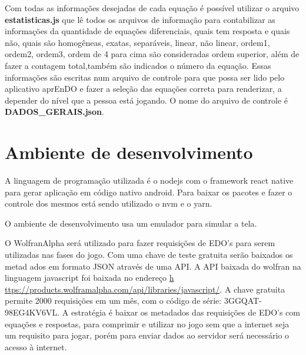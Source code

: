 Com todas as informações desejadas de cada equação é possível utilizar o arquivo \textbf{estatisticas.js} que lê todos os arquivos de informação para contabilizar as informações da quantidade de equações diferenciais, quais tem resposta e quais não, quais são homogêneas, exatas, separáveis, linear, não linear, ordem1, ordem2, ordem3, ordem de 4 para cima são consideradas ordem superior, além de fazer a contagem total,também são indicados o número da equação. Essas informações são escritas num arquivo de controle para que possa ser lido pelo aplicativo aprEnDO e fazer a seleção das equações correta para renderizar, a depender do nível que a pessoa está jogando. O nome do arquivo de controle é \textbf{DADOS\_GERAIS.json}.




\section[Ambiente de desenvolvimento]{Ambiente de desenvolvimento}

A linguagem de programação utilizada é o nodejs com o framework react native para gerar aplicação em código nativo android. Para baixar os pacotes e fazer o controle dos mesmos está sendo utilizado o nvm e o yarn.

O ambiente de desenvolvimento usa um emulador para simular a tela.

O WolfranAlpha será utilizado para fazer requisições de EDO's para serem utilizadas nas fases do jogo. Com uma chave de teste gratuita serão baixados os metad    ados em formato JSON através de uma API.
A API baixada do wolfran na linguagem javascript foi baixada no endereço \url{h    ttps://products.wolframalpha.com/api/libraries/javascript/}.
A chave gratuita permite 2000 requisições em um mês, com o código de série: 3GGQAT-98EG4KV6VL. A estratégia é baixar os metadados das requisições de EDO's com     equações e respostas, para comprimir e utilizar no jogo sem que a internet seja um requisito para jogar, porém para enviar dados ao servidor será necessário o acesso à internet.
